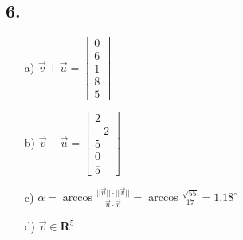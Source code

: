 \documentclass{article}
\begin{document}
\subsection*{6.}
\begin{itemize}
\item[a) ] $\vec{v}+\vec{u}=\begin{bmatrix}0 \\ 6 \\ 1 \\ 8 \\ 5 \end{bmatrix}$
\item[b) ] $\vec{v}-\vec{u}=\begin{bmatrix}2 \\ -2 \\ 5 \\ 0 \\ 5 \end{bmatrix}$
\item[c) ] $\alpha = \arccos{\frac{||\vec{u}|| \cdot ||\vec{v}||}{\vec{u} \cdot \vec{v}}} = \arccos{\frac{\sqrt{55}}{17}}=1.18^{\circ}$ 
\item[d) ] $\vec{v} \in \mathbf{R}^{5}$
\end{itemize}
\end{document}
